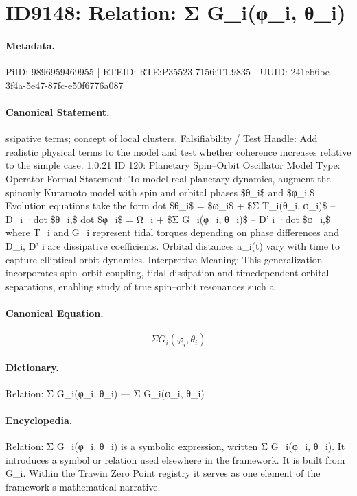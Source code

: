 \section*{ID9148: Relation: Σ G\_i(φ\_i, θ\_i)}
\paragraph{Metadata.}
PiID: 9896959469955 | RTEID: RTE:P35523.7156:T1.9835 | UUID: 241eb6be-3f4a-5e47-87fc-e50f6776a087

\paragraph{Canonical Statement.}
ssipative terms; concept of local clusters. Falsifiability / Test Handle: Add realistic physical terms to the model and test whether coherence increases relative to the simple case. 1.0.21 ID 120: Planetary Spin–Orbit Oscillator Model Type: Operator Formal Statement: To model real planetary dynamics, augment the spinonly Kuramoto model with spin and orbital phases \$θ\_i\$ and \$φ\_i.\$ Evolution equations take the form dot \$θ\_i\$ = \$ω\_i\$ + \$Σ T\_i(θ\_i, φ\_i)\$ – D\_i ·dot \$θ\_i,\$ dot \$φ\_i\$ = Ω\_i + \$Σ G\_i(φ\_i, θ\_i)\$ – D’ i ·dot \$φ\_i,\$ where T\_i and G\_i represent tidal torques depending on phase differences and D\_i, D’ i are dissipative coefficients. Orbital distances a\_i(t) vary with time to capture elliptical orbit dynamics. Interpretive Meaning: This generalization incorporates spin–orbit coupling, tidal dissipation and timedependent orbital separations, enabling study of true spin–orbit resonances such a

\paragraph{Canonical Equation.}
\[
Σ G_i(φ_i, θ_i)
\]

\paragraph{Dictionary.}
Relation: Σ G\_i(φ\_i, θ\_i) — Σ G\_i(φ\_i, θ\_i)

\paragraph{Encyclopedia.}
Relation: Σ G\_i(φ\_i, θ\_i) is a symbolic expression, written Σ G\_i(φ\_i, θ\_i). It introduces a symbol or relation used elsewhere in the framework. It is built from G\_i. Within the Trawin Zero Point registry it serves as one element of the framework's mathematical narrative.
